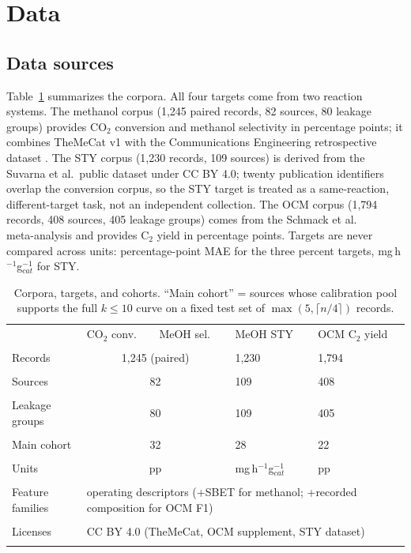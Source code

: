 \documentclass[11pt,a4paper]{article}
\begin{document}
\section{Data}\label{sec:data}
\subsection{Data sources}
Table~\ref{tab:data} summarizes the corpora. All four targets come from two reaction
systems. The methanol corpus (1{,}245 paired records, 82 sources, 80 leakage groups)
provides CO$_2$ conversion and methanol selectivity in percentage points; it combines
TheMeCat v1 \cite{toldy} with the Communications Engineering retrospective dataset
\cite{yan}. The STY corpus (1{,}230 records, 109 sources) is derived from the
Suvarna et al.\ public dataset \cite{suvarna} under CC BY 4.0; twenty publication
identifiers overlap the conversion corpus, so the STY target is treated as a
same-reaction, different-target task, not an independent collection. The OCM corpus
(1{,}794 records, 408 sources, 405 leakage groups) comes from the Schmack et al.\\
meta-analysis \cite{schmack} and provides C$_2$ yield in percentage points. Targets
are never compared across units: percentage-point MAE for the three percent targets,
mg\,h$^{-1}$g$_{cat}^{-1}$ for STY.

\begin{table}[t]
\centering\small
\caption{Corpora, targets, and cohorts. ``Main cohort'' = sources whose calibration pool
supports the full $k\le10$ curve on a fixed test set of $\max(5,\lceil n/4\rceil)$
records.}
\label{tab:data}
\begin{tabularx}{\linewidth}{lXXXX}
\toprule
 & CO$_2$ conv. & MeOH sel. & MeOH STY & OCM C$_2$ yield \\\\
\midrule
Records & \multicolumn{2}{c}{1{,}245 (paired)} & 1{,}230 & 1{,}794 \\\\
Sources & \multicolumn{2}{c}{82} & 109 & 408 \\\\
Leakage groups & \multicolumn{2}{c}{80} & 109 & 405 \\\\
Main cohort & \multicolumn{2}{c}{32} & 28 & 22 \\\\
Units & \multicolumn{2}{c}{pp} & mg\,h$^{-1}$g$_{cat}^{-1}$ & pp \\\\
Feature families & \multicolumn{4}{l}{operating descriptors (+SBET for methanol;
+recorded composition for OCM F1)} \\\\
Licenses & \multicolumn{4}{l}{CC BY 4.0 (TheMeCat, OCM supplement, STY dataset)} \\\\
\bottomrule
\end{tabularx}
\end{table}
\end{document}
